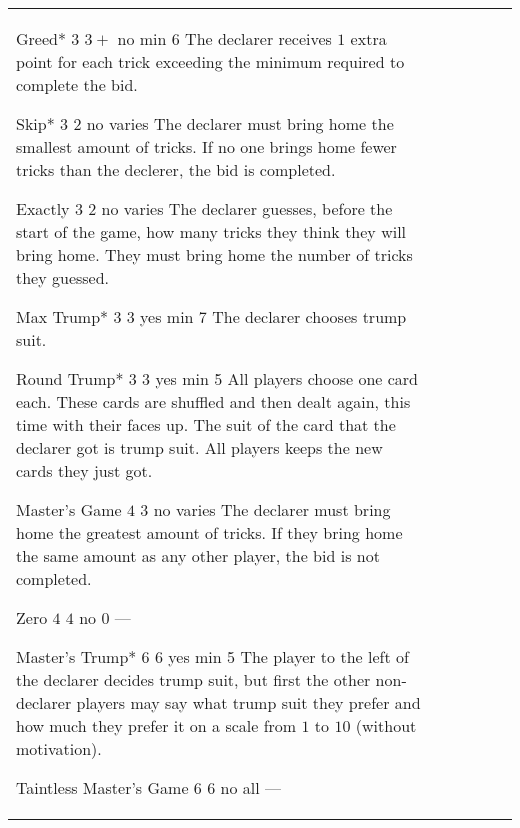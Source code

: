 \begin{table}
\begin{center}
\begin{tabularx}{\textwidth}{lcccc|X}
				\standardBidItem%
				{Greed*}
				{$3$}
				{$3+$}
				{no}
				{min 6}
				{%
					The declarer receives $1$ extra point for each trick exceeding the minimum required to complete the bid.
				}

				\standardBidItem%
				{Skip*}
				{$3$}
				{$2$}
				{no}
				{varies}
				{%
					The declarer must bring home the smallest amount of tricks. If no one brings home fewer tricks than the declerer, the bid is completed.
				}

				\standardBidItem%
				{Exactly}
				{$3$}
				{$2$}
				{no}
				{varies}
				{%
					The declarer guesses, before the start of the game, how many tricks they think they will bring home. They must bring home the number of tricks they guessed.
				}

				\standardBidItem%
				{Max Trump*}
				{$3$}
				{$3$}
				{yes}
				{min 7}
				{%
					The declarer chooses trump suit.
				}

				\standardBidItem%
				{Round Trump*}
				{$3$}
				{$3$}
				{yes}
				{min 5}
				{%
					All players choose one card each. These cards are shuffled and then dealt again, this time with their faces up. The suit of the card that the declarer got is trump suit. All players keeps the new cards they just got.
				}

				\standardBidItem%
				{Master's Game}
				{$4$}
				{$3$}
				{no}
				{varies}
				{%
					The declarer must bring home the greatest amount of tricks. If they bring home the same amount as any other player, the bid is not completed. 
				}

				\standardBidItem%
				{Zero}
				{$4$}
				{$4$}
				{no}
				{0}
				{%
					---
				}

				\standardBidItem%
				{Master's Trump*}
				{$6$}
				{$6$}
				{yes}
				{min 5}
				{%
					The player to the left of the declarer decides trump suit, but first the other non-declarer players may say what trump suit they prefer and how much they prefer it on a scale from $1$ to $10$ (without motivation).
				}

				\standardBidItem%
				{Taintless Master's Game}
				{$6$}
				{$6$}
				{no}
				{all}
				{%
					---
				}
		\end{tabularx}
	\end{center}
\end{table}
